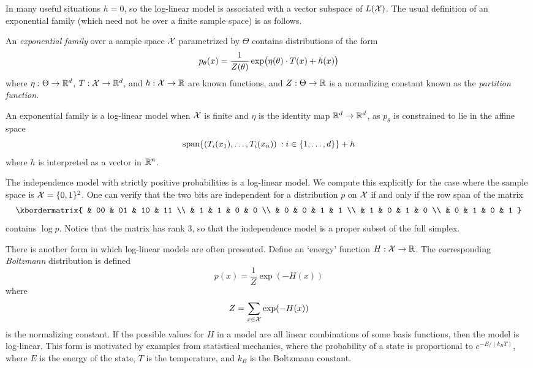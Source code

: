 \documentclass[cclicense]{hmcthesis}
\numberwithin{equation}{chapter}
\numberwithin{ucounter}{chapter}
\begin{document}
    In many useful situations $h = 0$, so the log-linear model is associated
    with a vector subspace of $L(\xs)$.
    The usual definition of an exponential family (which need not be over a
    finite sample space) is as follows.
    \begin{definition}
        An \emph{exponential family} over a sample space $\xs$ parametrized by
        $\Theta$ contains distributions of the form
        \[
            p_\theta(x) = 
            \frac 1 {Z(\theta)}
            \exp\pdel[\big]{
                \displaystyle \eta(\theta) \cdot T(x) + h(x)
            }
        \]
        where $\eta : \Theta \to \R^d$, $T:\xs \to \R^d$, and $h: \xs \to \R$
        are known functions, and $Z:\Theta \to \R$ is a normalizing constant
        known as the \emph{partition function}.
    \end{definition}
    An exponential family is a log-linear model when $\xs$ is finite and $\eta$
    is the identity map $\R^d \to \R^d$, as $p_\theta$ is constrained to lie in
    the affine space
    \[
        \spanset{
            (T_i(x_1), \ldots, T_i(x_n)) \:: i \in \{1, \ldots, d\}
        } + h
    \]
    where $h$ is interpreted as a vector in $\R^n$.  

    \begin{example}
        The independence model with strictly positive probabilities is a
        log-linear model.  We compute this explicitly for the case where the
        sample space is $\xs = \{0, 1\}^2$.  One can verify that the two bits
        are independent for a distribution $p$ on $\xs$ if and only if 
        the row span of the matrix
        \[
            \kbordermatrix{
                & 00 & 01 & 10 & 11 \\
                &  1 &  1 &  0 &  0 \\
                &  0 &  0 &  1 &  1 \\
                &  1 &  0 &  1 &  0 \\
                &  0 &  1 &  0 &  1
            }
        \]
        contains $\log p$.  Notice that the matrix has rank 3, so that the
        independence model is a proper subset of the full simplex.
    \end{example}

    There is another form in which log-linear models are often presented.
    Define an `energy' function $H: \xs \to \R$.  The corresponding
    \emph{Boltzmann} distribution is defined
    \[
        p(x) = \frac 1 Z \exp(-H(x))
    \]
    where
    \[
        Z = \sum_{x \in \xs} \exp(-H(x))
    \]
    is the normalizing constant.  If the possible
    values for $H$ in a model are all linear combinations of some basis
    functions, then the model is log-linear.  This form is motivated by examples
    from statistical mechanics, where the probability of a state is proportional
    to $e^{-E/(k_BT)}$, where $E$ is the energy of the state, $T$ is the
    temperature, and $k_B$ is the Boltzmann constant.
\end{document}
